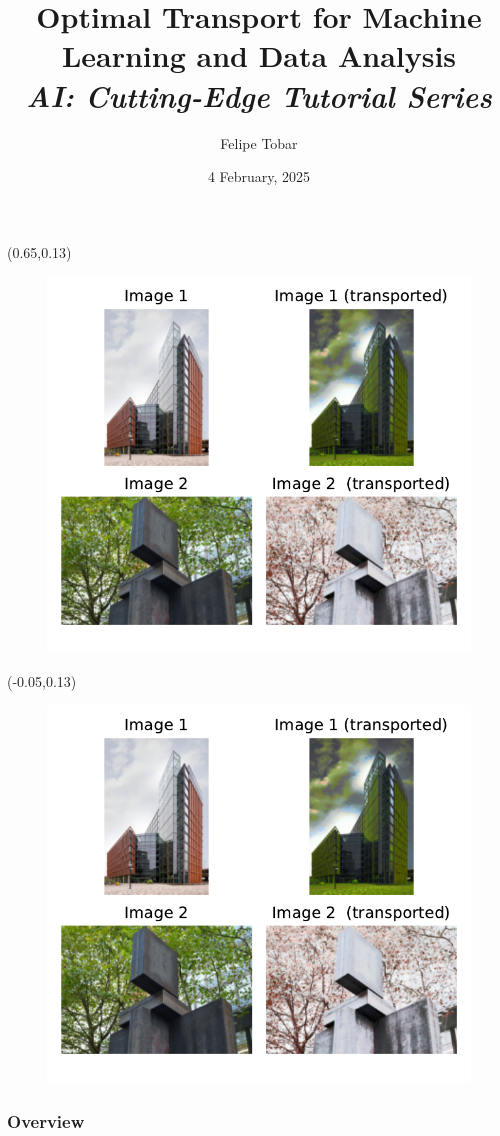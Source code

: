\documentclass[pdf,aspectratio=169,10pt]{beamer}
\title[Tobar, Optimal Transport for Machine Learning and Data Analysis]{Optimal Transport for Machine Learning and Data Analysis\\ \vspace{1em} \large{\it AI: Cutting-Edge Tutorial Series}
}
\author[]{Felipe Tobar}
\institute[]{Department of Mathematics \& I-X\\ Imperial College London}
\date{4 February, 2025}
\begin{document}
\begin{frame}[plain]
    \titlepage
    \footnotesize

    \begin{textblock}{0.45}(0.65,0.13)
        \begin{figure}
            \includegraphics[trim={7cm 5cm 1cm 1cm},clip, height=0.4\textwidth]{../img/ex1_result.pdf}
        \end{figure}
    \end{textblock}

    \begin{textblock}{0.45}(-0.05,0.13)
        \begin{figure}
            \includegraphics[trim={1cm 5cm 6.5cm 1cm},clip, height=0.4\textwidth]{../img/ex1_result.pdf}
        \end{figure}
    \end{textblock}



\end{frame}


\begin{frame}
    \frametitle{Overview} 
    \tableofcontents
\end{frame}
\end{document}
